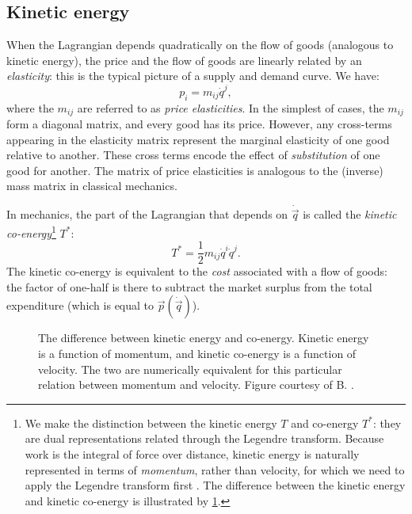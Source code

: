 \subsection{Kinetic energy} When the Lagrangian depends quadratically on the flow of goods (analogous to kinetic energy), the price and the flow of goods are linearly related by an \emph{elasticity}: this is the typical picture of a supply and demand curve. We have:
\begin{equation}
     p_i = m_{ij} \dot{q}^j,
\end{equation}
where the \(m_{ij}\) are referred to as \emph{price elasticities}. In the simplest of cases, the \(m_{ij}\) form a diagonal matrix, and every good has its price. However, any cross-terms appearing in the elasticity matrix represent the marginal elasticity of one good relative to another. These cross terms encode the effect of \emph{substitution} of one good for another. The matrix of price elasticities is analogous to the (inverse) mass matrix in classical mechanics.

In mechanics, the part of the Lagrangian that depends on \(\dot{\vec{q}}\) is called the \emph{kinetic co-energy}\footnote{We make the distinction between the kinetic energy \(T\) and co-energy \(T^*\): they are dual representations related through the Legendre transform. Because work is the integral of force over distance, kinetic energy is naturally represented in terms of \emph{momentum}, rather than velocity, for which we need to apply the Legendre transform first \cite{Jeltsema2009}. The difference between the kinetic energy and kinetic co-energy is illustrated by \cref{fig:kinetic_energy}.} \(T^*\):
\begin{equation}
    T^* = \frac{1}{2}m_{ij}\dot{q}^i \dot{q}^j.
\end{equation} 
The kinetic co-energy is equivalent to the \emph{cost} associated with a flow of goods: the factor of one-half is there to subtract the market surplus from the total expenditure (which is equal to \(\vec{p}(\dot{\vec{q}})\)).

\begin{figure}
    \centering
    
    \caption{The difference between kinetic energy and co-energy. Kinetic energy is a function of momentum, and kinetic co-energy is a function of velocity. The two are numerically equivalent for this particular relation between momentum and velocity. Figure courtesy of B. \citet{Krabbenborg2021}.}
    \label{fig:kinetic_energy}
\end{figure}

